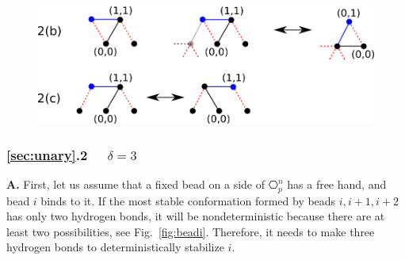 \begin{figure}
	\centering
	\includegraphics[width=0.8\linewidth]{./Fig/hexagonOut3n}
	
	\caption{}
	\label{fig:hexagonOut2}
\end{figure}


\subsubsection{\ref{sec:unary}.2 \ \ $\delta = 3$\\}

\textbf{A.} First, let us assume that a fixed bead on a side of $\hexagon_p^n$ has a free hand, and bead $i$ binds to it. If the most stable conformation formed by beads $i, i+1, i+2$ has only two hydrogen bonds, it will be nondeterministic because there are at least two possibilities, see Fig.~\ref{fig:beadi}. Therefore, it needs to make three hydrogen bonds to deterministically stabilize $i$.\\

